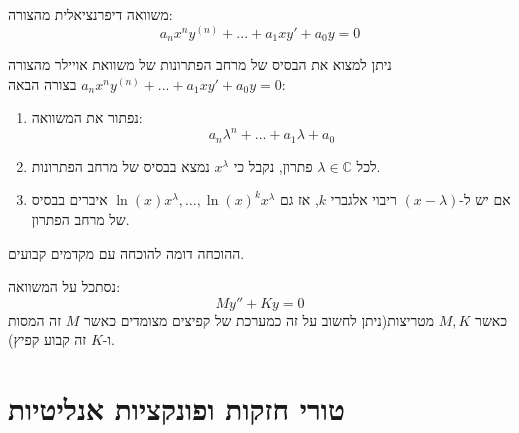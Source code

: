 \documentclass{tstextbook}
\begin{document}
\begin{definition}
משוואה דיפרנציאלית מהצורה:
$$a_n x^n y^{(n)}+...+a_1 x y' + a_0 y = 0$$

\end{definition}
\begin{proposition}
ניתן למצוא את הבסיס של מרחב הפתרונות של משוואת אויילר מהצורה \(a_n x^n y^{(n)}+...+a_1 x y' + a_0 y = 0\) בצורה הבאה:

  \begin{enumerate}
    \item נפתור את המשוואה: 
$$a_n \lambda^n + ... + a_1\lambda + a_0$$


    \item לכל \(\lambda \in \mathbb{C}\) פתרון, נקבל כי \(x^{\lambda}\) נמצא בבסיס של מרחב הפתרונות. 


    \item אם יש ל-\(\left( x-\lambda \right)\) ריבוי אלגברי \(k\), אז גם \(\ln(x)x^{\lambda},\dots,\ln(x)^{k}x^{\lambda}\) איברים בבסיס של מרחב הפתרון. 


  \end{enumerate}
\end{proposition}
ההוכחה דומה להוכחה עם מקדמים קבועים.

\begin{example}
נסתכל על המשוואה:
$$My''+Ky=0$$
כאשר \(M,K\) מטריצות(ניתן לחשוב על זה כמערכת של קפיצים מצומדים כאשר \(M\) זה המסות ו-\(K\) זה קבוע קפיץ).

\end{example}

\section{טורי חזקות ופונקציות אנליטיות}
\end{document}
